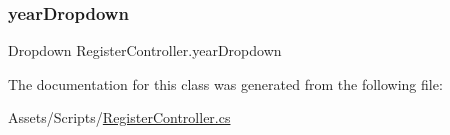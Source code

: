 \mbox{\label{classRegisterController_a3d0d5c6827a821305a047ac365a46fd0}} 
\subsubsection{\texorpdfstring{year\+Dropdown}{yearDropdown}}
{\footnotesize\ttfamily Dropdown Register\+Controller.\+year\+Dropdown}



The documentation for this class was generated from the following file\+:\begin{DoxyCompactItemize}
\item 
Assets/\+Scripts/\hyperlink{RegisterController_8cs}{Register\+Controller.\+cs}\end{DoxyCompactItemize}

